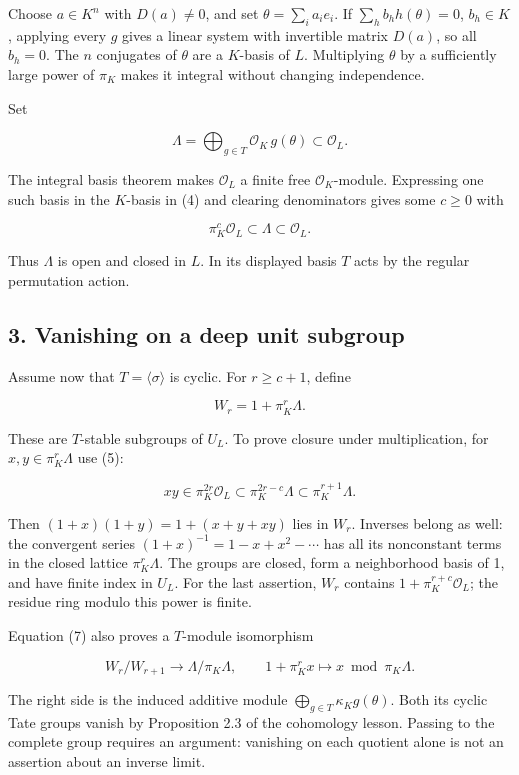 \documentclass[11pt,a4paper]{article}
\begin{document}
Choose \(a\in K^n\) with \(D(a)\ne0\), and set
\(\theta=\sum_i a_i e_i\). If \(\sum_h b_h h(\theta)=0\), \(b_h\in K\),
applying every \(g\) gives a linear system with invertible matrix
\(D(a)\), so all \(b_h=0\). The \(n\) conjugates of \(\theta\) are a
\(K\)-basis of \(L\). Multiplying \(\theta\) by a sufficiently large
power of \(\pi_K\) makes it integral without changing independence.

Set

\[
\Lambda=\bigoplus_{g\in T}\mathcal O_K\,g(\theta)
\subset\mathcal O_L.
\tag{4}
\]

The integral basis theorem makes \(\mathcal O_L\) a finite free
\(\mathcal O_K\)-module. Expressing one such basis in the \(K\)-basis in
(4) and clearing denominators gives some \(c\geq0\) with

\[
\pi_K^c\mathcal O_L\subset\Lambda\subset\mathcal O_L.
\tag{5}
\]

Thus \(\Lambda\) is open and closed in \(L\). In its displayed basis
\(T\) acts by the regular permutation action.

\subsection{3. Vanishing on a deep unit
subgroup}\label{vanishing-on-a-deep-unit-subgroup}

Assume now that \(T=\langle\sigma\rangle\) is cyclic. For \(r\geq c+1\),
define

\[
W_r=1+\pi_K^r\Lambda.
\tag{6}
\]

These are \(T\)-stable subgroups of \(U_L\). To prove closure under
multiplication, for \(x,y\in\pi_K^r\Lambda\) use (5):

\[
xy\in\pi_K^{2r}\mathcal O_L
\subset\pi_K^{2r-c}\Lambda
\subset\pi_K^{r+1}\Lambda.
\tag{7}
\]

Then \((1+x)(1+y)=1+(x+y+xy)\) lies in \(W_r\). Inverses belong as well:
the convergent series \((1+x)^{-1}=1-x+x^2-\cdots\) has all its
nonconstant terms in the closed lattice \(\pi_K^r\Lambda\). The groups
are closed, form a neighborhood basis of 1, and have finite index in
\(U_L\). For the last assertion, \(W_r\) contains
\(1+\pi_K^{r+c}\mathcal O_L\); the residue ring modulo this power is
finite.

Equation (7) also proves a \(T\)-module isomorphism

\[
W_r/W_{r+1}\longrightarrow\Lambda/\pi_K\Lambda,\qquad
1+\pi_K^r x\longmapsto x\bmod\pi_K\Lambda.
\tag{8}
\]

The right side is the induced additive module
\(\bigoplus_{g\in T}\kappa_K g(\theta)\). Both its cyclic Tate groups
vanish by Proposition 2.3 of the cohomology lesson. Passing to the
complete group requires an argument: vanishing on each quotient alone is
not an assertion about an inverse limit.
\end{document}
